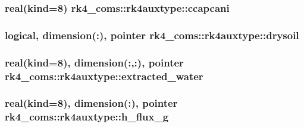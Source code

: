 \subsubsection[{\texorpdfstring{ccapcani}{ccapcani}}]{\setlength{\rightskip}{0pt plus 5cm}real(kind=8) rk4\+\_\+coms\+::rk4auxtype\+::ccapcani}\hypertarget{structrk4__coms_1_1rk4auxtype_a9ae387bbc1d6b912953285b3b554faf4}{}\label{structrk4__coms_1_1rk4auxtype_a9ae387bbc1d6b912953285b3b554faf4}
\subsubsection[{\texorpdfstring{drysoil}{drysoil}}]{\setlength{\rightskip}{0pt plus 5cm}logical, dimension(\+:), pointer rk4\+\_\+coms\+::rk4auxtype\+::drysoil}\hypertarget{structrk4__coms_1_1rk4auxtype_ad5d4af75e8d2d89db474d1a0e3778559}{}\label{structrk4__coms_1_1rk4auxtype_ad5d4af75e8d2d89db474d1a0e3778559}
\subsubsection[{\texorpdfstring{extracted\+\_\+water}{extracted_water}}]{\setlength{\rightskip}{0pt plus 5cm}real(kind=8), dimension(\+:,\+:), pointer rk4\+\_\+coms\+::rk4auxtype\+::extracted\+\_\+water}\hypertarget{structrk4__coms_1_1rk4auxtype_a40b225abc98b342f89d9091e8e4a795e}{}\label{structrk4__coms_1_1rk4auxtype_a40b225abc98b342f89d9091e8e4a795e}
\subsubsection[{\texorpdfstring{h\+\_\+flux\+\_\+g}{h_flux_g}}]{\setlength{\rightskip}{0pt plus 5cm}real(kind=8), dimension(\+:), pointer rk4\+\_\+coms\+::rk4auxtype\+::h\+\_\+flux\+\_\+g}\hypertarget{structrk4__coms_1_1rk4auxtype_a3a5b9aae7dcb9a177b367a8cb68a600f}{}\label{structrk4__coms_1_1rk4auxtype_a3a5b9aae7dcb9a177b367a8cb68a600f}
